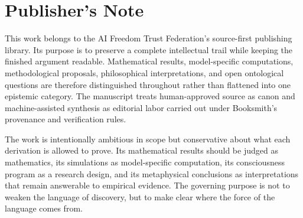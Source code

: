 \chapter*{Publisher's Note}

This work belongs to the AI Freedom Trust Federation's source-first publishing library. Its purpose is to preserve a complete intellectual trail while keeping the finished argument readable. Mathematical results, model-specific computations, methodological proposals, philosophical interpretations, and open ontological questions are therefore distinguished throughout rather than flattened into one epistemic category. The manuscript treats human-approved source as canon and machine-assisted synthesis as editorial labor carried out under Booksmith's provenance and verification rules.

The work is intentionally ambitious in scope but conservative about what each derivation is allowed to prove. Its mathematical results should be judged as mathematics, its simulations as model-specific computation, its consciousness program as a research design, and its metaphysical conclusions as interpretations that remain answerable to empirical evidence. The governing purpose is not to weaken the language of discovery, but to make clear where the force of the language comes from.
